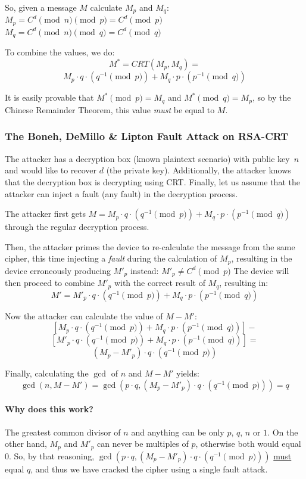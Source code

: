 So, given a message \(M\) calculate \(M_p\) and \(M_q\):
\(M_p = C^d \pmod{n}\pmod{p} = C^d \pmod{p}\)
\(M_q = C^d \pmod{n}\pmod{q} = C^d \pmod{q}\)

To combine the values, we do:
\[M^* = CRT(M_p, M_q) = \]
\[M_p \cdot q \cdot (q^{-1} \pmod p) + M_q \cdot p \cdot (p^{-1} \pmod q)\]

It is easily provable that \(M^* \pmod{p} = M_q\) and \(M^* \pmod{q} = M_p\), so by the Chinese Remainder Theorem, this value \emph{must} be equal to \(M\).

\subsubsection{The Boneh, DeMillo \& Lipton Fault Attack on RSA-CRT~\cite{boneh}}\label{subsubsec:the_boneh_demillo_lipton_fault_attack_on_rsa_crt}

The attacker has a decryption box (known plaintext scenario) with public key\
\(n\) and would like to recover \(d\) (the private key). Additionally, the attacker knows that the decryption box is decrypting using CRT\@. Finally, let us assume that the attacker can inject a fault (any fault) in the decryption process.

The attacker first gets \(M = M_p\cdot q\cdot (q^{-1} \pmod{p}) + M_q\cdot p\cdot (p^{-1} \pmod{q})\)
through the regular decryption process.

Then, the attacker primes the device to re-calculate the message from the same cipher, this time injecting a \emph{fault} during the calculation of \(M_p\), 
resulting in the device erroneously producing \(M'_p\) instead:
\(M'_p \neq C^d \pmod{p}\)
The device will then proceed to combine \(M'_p\) with the correct result of 
\(M_q\), resulting in:
\[M' =  M'_p \cdot q \cdot (q^{-1} \pmod{p}) + M_q \cdot p \cdot (p^{-1} \pmod{q})\]

Now the attacker can calculate the value of \(M - M'\):
\[[M_p \cdot q \cdot (q^{-1} \pmod{p}) + M_q \cdot p \cdot (p^{-1} \pmod{q})]-\]
\[[M'_p \cdot q \cdot (q^{-1} \pmod{p}) + M_q \cdot p \cdot (p^{-1} \pmod{q})]=\]
\[(M_p - M'_p) \cdot q \cdot (q^{-1} \pmod{p})\]

Finally, calculating the \(\gcd \) of \(n\) and \(M - M'\) yields:
\[\gcd(n, M - M') = \gcd(p \cdot q, (M_p - M'_p) \cdot q \cdot (q^{-1} \pmod{p})) = q\]

\paragraph{Why does this work?} The greatest common divisor of \(n\) and 
anything can be only \(p\), \(q\), \(n\) or \(1\). On the other hand, \(M_p\) and \(M'_p\) can never be multiples of \(p\), otherwise both would equal 0. So, by that reasoning, \(\gcd(p \cdot q, (M_p - M'_p) \cdot q \cdot (q^{-1} \pmod{p}))\) \underline{must} equal \(q\), and thus we have cracked the cipher using a single fault attack.


